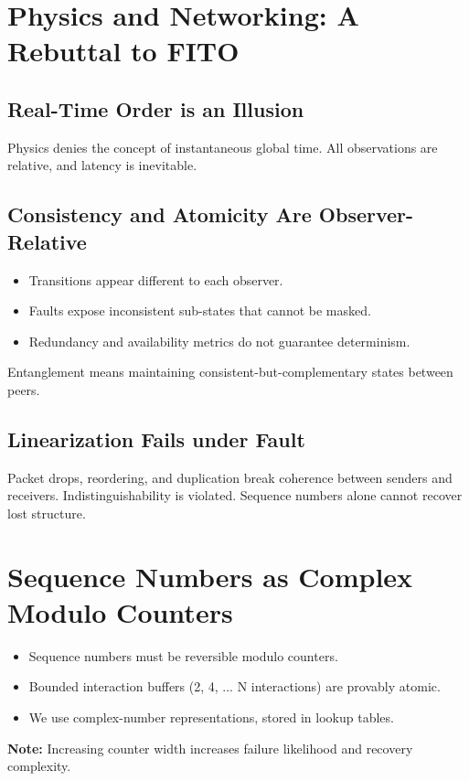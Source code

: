 \section{Physics and Networking: A Rebuttal to FITO}

\subsection{Real-Time Order is an Illusion}
Physics denies the concept of instantaneous global time. All observations are relative, and latency is inevitable.

\subsection{Consistency and Atomicity Are Observer-Relative}
\begin{itemize}
  \item Transitions appear different to each observer.
  \item Faults expose inconsistent sub-states that cannot be masked.
  \item Redundancy and availability metrics do not guarantee determinism.
\end{itemize}

Entanglement means maintaining consistent-but-complementary states between peers.

\subsection{Linearization Fails under Fault}
Packet drops, reordering, and duplication break coherence between senders and receivers. Indistinguishability is violated. Sequence numbers alone cannot recover lost structure.

\section{Sequence Numbers as Complex Modulo Counters}

\begin{itemize}
  \item Sequence numbers must be reversible modulo counters.
  \item Bounded interaction buffers (2, 4, ... N interactions) are provably atomic.
  \item We use complex-number representations, stored in lookup tables.
\end{itemize}

\textbf{Note:} Increasing counter width increases failure likelihood and recovery complexity.

